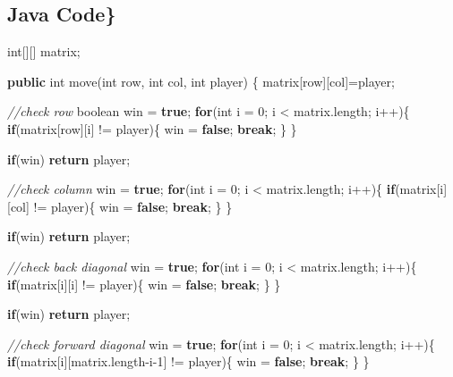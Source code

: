 \documentclass[]{book}
\newenvironment{Shaded}{\begin{snugshade}}{\end{snugshade}}
\newcommand{\CommentTok}[1]{\textcolor[rgb]{0.56,0.35,0.01}{\textit{#1}}}
\newcommand{\DataTypeTok}[1]{\textcolor[rgb]{0.13,0.29,0.53}{#1}}
\newcommand{\DecValTok}[1]{\textcolor[rgb]{0.00,0.00,0.81}{#1}}
\newcommand{\FunctionTok}[1]{\textcolor[rgb]{0.00,0.00,0.00}{#1}}
\newcommand{\KeywordTok}[1]{\textcolor[rgb]{0.13,0.29,0.53}{\textbf{#1}}}
\newcommand{\NormalTok}[1]{#1}
\begin{document}
\hypertarget{java-code-35}{%
\subsection{Java Code\}}\label{java-code-35}}

\begin{Shaded}
\begin{Highlighting}[]
\DataTypeTok{int}\NormalTok{[][] matrix;}

\KeywordTok{public} \DataTypeTok{int} \FunctionTok{move}\NormalTok{(}\DataTypeTok{int}\NormalTok{ row, }\DataTypeTok{int}\NormalTok{ col, }\DataTypeTok{int}\NormalTok{ player) \{}
\NormalTok{    matrix[row][col]=player;}

    \CommentTok{//check row}
    \DataTypeTok{boolean}\NormalTok{ win = }\KeywordTok{true}\NormalTok{;}
    \KeywordTok{for}\NormalTok{(}\DataTypeTok{int}\NormalTok{ i = }\DecValTok{0}\NormalTok{; i < matrix.}\FunctionTok{length}\NormalTok{; i++)\{}
        \KeywordTok{if}\NormalTok{(matrix[row][i] != player)\{}
\NormalTok{            win = }\KeywordTok{false}\NormalTok{;}
            \KeywordTok{break}\NormalTok{;}
\NormalTok{        \}}
\NormalTok{    \}}

    \KeywordTok{if}\NormalTok{(win) }\KeywordTok{return}\NormalTok{ player;}

    \CommentTok{//check column}
\NormalTok{    win = }\KeywordTok{true}\NormalTok{;}
    \KeywordTok{for}\NormalTok{(}\DataTypeTok{int}\NormalTok{ i = }\DecValTok{0}\NormalTok{; i < matrix.}\FunctionTok{length}\NormalTok{; i++)\{}
        \KeywordTok{if}\NormalTok{(matrix[i][col] != player)\{}
\NormalTok{            win = }\KeywordTok{false}\NormalTok{;}
            \KeywordTok{break}\NormalTok{;}
\NormalTok{        \}}
\NormalTok{    \}}

    \KeywordTok{if}\NormalTok{(win) }\KeywordTok{return}\NormalTok{ player;}

    \CommentTok{//check back diagonal}
\NormalTok{    win = }\KeywordTok{true}\NormalTok{;}
    \KeywordTok{for}\NormalTok{(}\DataTypeTok{int}\NormalTok{ i = }\DecValTok{0}\NormalTok{; i < matrix.}\FunctionTok{length}\NormalTok{; i++)\{}
        \KeywordTok{if}\NormalTok{(matrix[i][i] != player)\{}
\NormalTok{            win = }\KeywordTok{false}\NormalTok{;}
            \KeywordTok{break}\NormalTok{;}
\NormalTok{        \}}
\NormalTok{    \}}

    \KeywordTok{if}\NormalTok{(win) }\KeywordTok{return}\NormalTok{ player;}

    \CommentTok{//check forward diagonal}
\NormalTok{    win = }\KeywordTok{true}\NormalTok{;}
    \KeywordTok{for}\NormalTok{(}\DataTypeTok{int}\NormalTok{ i = }\DecValTok{0}\NormalTok{; i < matrix.}\FunctionTok{length}\NormalTok{; i++)\{}
        \KeywordTok{if}\NormalTok{(matrix[i][matrix.}\FunctionTok{length}\NormalTok{-i}\DecValTok{-1}\NormalTok{] != player)\{}
\NormalTok{            win = }\KeywordTok{false}\NormalTok{;}
            \KeywordTok{break}\NormalTok{;}
\NormalTok{        \}}
\NormalTok{    \}}


\end{Highlighting}
\end{Shaded}
\end{document}
